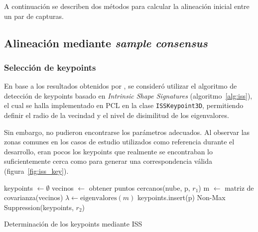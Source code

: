 	A continuación se describen dos métodos para calcular la alineación inicial entre un par de capturas.

	\subsection{Alineación mediante \emph{sample consensus}}
		\subsubsection{Selección de keypoints}
			En base a los resultados obtenidos por \cite{ISS},
			se consideró utilizar el algoritmo de detección de keypoints basado en \emph{Intrinsic Shape Signatures} (algoritmo~\ref{alg:iss}),
			el cual se halla implementado en PCL en la clase \texttt{ISSKeypoint3D}, permitiendo
			definir el radio de la vecindad y el nivel de disimilitud de los eigenvalores.


			Sin embargo, no pudieron encontrarse los parámetros adecuados.
			Al observar las zonas comunes en los casos de estudio
			utilizados como referencia durante el desarrollo,
			eran pocos los keypoints que
			realmente se encontraban lo suficientemente cerca como para generar
			una correspondencia válida (figura~\ref{fig:iss_key}).



			\begin{algorithm}
				\begin{algorithmic}[1]
						\State keypoints $\gets\emptyset$
							\State vecinos $\gets$ obtener puntos cercanos(nube, p, $r_1$)
							\State m $\gets$ matriz de covarianza(vecinos)
							\State $\lambda\gets\text{eigenvalores}(m)$
								\State keypoints.insert(p)
							\EndIf
						\EndFor
						\State\Return Non-Max Suppression(keypoints, $r_2$)
					\EndFunction
				\end{algorithmic}
				\caption[Determinación de los keypoints mediante ISS]{\label{alg:iss}Determinación de los keypoints mediante ISS}
			\end{algorithm}


